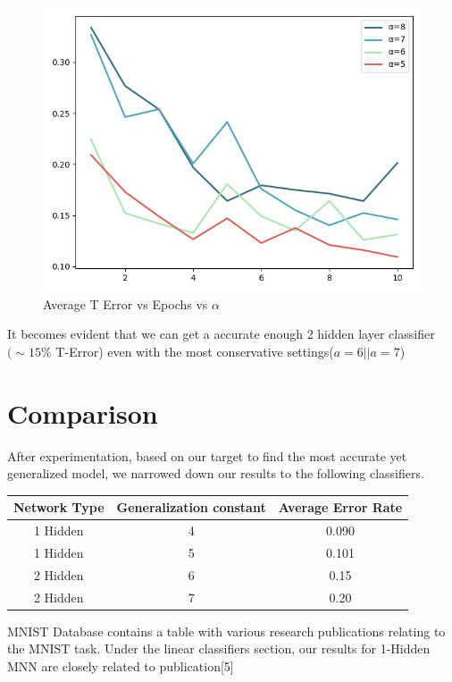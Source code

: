\documentclass{proc}
\begin{document}
	\begin{figure}[!h]
		\includegraphics[width=\linewidth]{gentwo.png}
		\caption{Average T Error vs Epochs vs $\alpha$}
		\label{fig:1-X-1}
	\end{figure}
	
	It becomes evident that we can get a accurate enough 2 hidden layer classifier $(\sim 15\% $ T-Error) even with the most conservative settings(${a=6  || a=7}$)
	

	\section{Comparison}
	
	After experimentation, based on our target to find the most accurate yet generalized model, we narrowed down our results to the following classifiers.
	\begin{center}
		\begin{tabular}{ |c|c|c| }
			\hline
			Network Type&Generalization constant &Average Error Rate \\
			\hline
			1 Hidden &4  & 0.090 \\
			1 Hidden &5  & 0.101 \\
			2 Hidden &6  & 0.15 \\
			2 Hidden &7  & 0.20 \\
			\hline
		\end{tabular}
	\end{center}

    MNIST Database contains a table with various research publications relating to the MNIST task. Under the linear classifiers section, our results for 1-Hidden MNN are closely related to publication[5]
	
\end{document}
